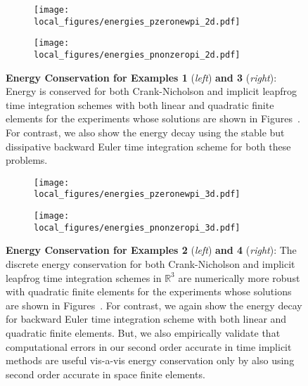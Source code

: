 \documentclass{amsart}
\theoremstyle{thmstyleone}%
\theoremstyle{thmstyletwo}%
\theoremstyle{thmstylethree}%
\def\R{\mathbb{R}}
\begin{document}
\vspace*{\fill}
\begin{figure}[h]
  \centering
  \begin{subfigure}[t]{0.48\linewidth}
    \centering \texttt{[image: local\_figures/energies\_pzeronewpi\_2d.pdf]}
  \end{subfigure}
  \hspace{0.025\linewidth}
  \begin{subfigure}[t]{0.48\linewidth}
    \centering \texttt{[image: local\_figures/energies\_pnonzeropi\_2d.pdf]}
  \end{subfigure}
  \caption{\textbf{Energy Conservation for Examples 1} (\textit{left}) \textbf{and 3} (\textit{right}): Energy is conserved for both Crank-Nicholson and implicit leapfrog time integration schemes with both linear and quadratic finite elements for the experiments whose solutions are shown in Figures~. For contrast, we also show the energy decay using the stable but dissipative backward Euler time integration scheme for both these problems.}
  \label{fig:2d_energies}
\end{figure}

\vspace*{\fill}
\begin{figure}[h]
  \centering
  \begin{subfigure}[t]{0.48\linewidth}
    \centering \texttt{[image: local\_figures/energies\_pzeronewpi\_3d.pdf]}
  \end{subfigure}
  \hspace{0.02\linewidth}
  \begin{subfigure}[t]{0.48\linewidth}
    \centering \texttt{[image: local\_figures/energies\_pnonzeropi\_3d.pdf]}
  \end{subfigure}
  \caption{\textbf{Energy Conservation for Examples 2} (\textit{left}) \textbf{and 4} (\textit{right}): The discrete energy conservation for both Crank-Nicholson and implicit leapfrog time integration schemes in $\R^3$ are numerically more robust with quadratic finite elements for the experiments whose solutions are shown in Figures~. For contrast, we again show the energy decay for backward Euler time integration scheme with both linear and quadratic finite elements. But, we also empirically validate that computational errors in our second order accurate in time implicit methods are useful vis-a-vis energy conservation only by also using second order accurate in space finite elements.}
  \label{fig:3d_energies}
\end{figure}
\vspace{\fill}
\clearpage
\end{document}
